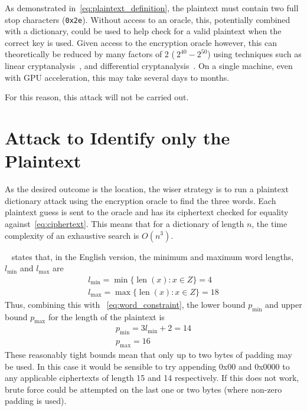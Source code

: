 \documentclass[11pt]{article}
\DeclareMathOperator{\len}{len}
\begin{document}
\begin{multicols*}{2}
        As demonstrated in~\eqref{eq:plaintext_definition}, the plaintext must contain two full stop characters (\texttt{0x2e}).
        Without access to an oracle, this, potentially combined with a dictionary, could be used to help check for a valid plaintext when the correct key is used.
        Given access to the encryption oracle however, this can theoretically be reduced by many factors of 2 ($~2^{40}-2^{50}$) using techniques such as linear cryptanalysis~\cite{matsui1993linear}, and differential cryptanalysis~\cite{biham1992differential}.
        On a single machine, even with GPU acceleration, this may take several days to months.

        For this reason, this attack will not be carried out.


        \section{Attack to Identify only the Plaintext}\label{sec:plaintext-identification-attack}
        As the desired outcome is the  location, the wiser strategy is to run a plaintext dictionary attack using the encryption oracle to find the three words.
        Each plaintext guess is sent to the oracle and has its ciphertext checked for equality against~\eqref{eq:ciphertext}.
        This means that for a dictionary of length $n$, the time complexity of an exhaustive search is $O(n^3)$.

        ~\cite{what3words_support} states that, in the English version, the minimum and maximum word lengths, $l_{\min}$ and $l_{\max}$ are
        \begin{gather*}
            l_{\min} = \min\{ \len(x) : x \in Z \} = 4\\
            l_{\max} = \max\{ \len(x) : x \in Z \} = 18
        \end{gather*}
        Thus, combining this with ~\eqref{eq:word_constraint}, the lower bound $p_{\min}$ and upper bound $p_{\max}$ for the length of the plaintext is
        \begin{gather*}
            p_{\min} = 3l_{\min} + 2 = 14\\
            p_{\max} = 16
        \end{gather*}
        These reasonably tight bounds mean that only up to two bytes of padding may be used.
        In this case it would be sensible to try appending 0x00 and 0x0000 to any applicable ciphertexts of length 15 and 14 respectively.
        If this does not work, brute force could be attempted on the last one or two bytes (where non-zero padding is used).


\end{multicols*}
\end{document}
